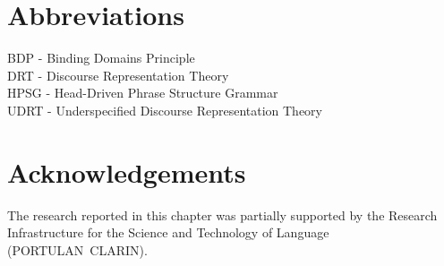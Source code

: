 \documentclass[output=paper
,modfonts
,nonflat]{langsci/langscibook}
\begin{document}
\section*{Abbreviations}

BDP - Binding Domains Principle\\
DRT - Discourse Representation Theory\\
HPSG - Head-Driven Phrase Structure Grammar\\
UDRT - Underspecified Discourse Representation Theory

\section*{Acknowledgements}

The research reported in this chapter was partially supported by the 
Research Infrastructure  for  the Science  and  Technology of Language (\mbox{PORTULAN CLARIN}).


{\sloppy
\printbibliography[heading=subbibliography,notkeyword=this]
}
\end{document}

